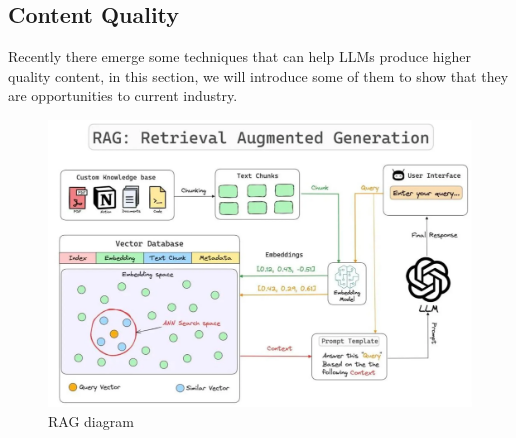 \documentclass[fleqn,10pt]{SelfArx} %
\begin{document}
\subsection{Content Quality}
Recently there emerge some techniques that can help LLMs produce higher quality content, in this section, we will introduce some of them to show that they are opportunities to current industry.

\begin{figure}[ht]\centering
	\includegraphics[width=\linewidth]{Figures/RAG.png}
	\caption{RAG diagram}
	\label{fig:rag}
\end{figure}
\end{document}
